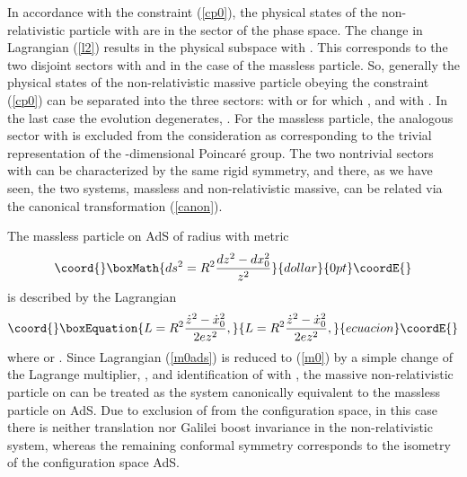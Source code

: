 \documentclass[a4paper,12pt]{article}
\begin{document}
In accordance with the constraint
(\ref{cp0}),
the physical states
of the non-relativistic particle
with \coordHE{}  are in the \coordHE{} sector
of the phase space.
The change
\coordHE{} in Lagrangian (\ref{l2})
results in the physical subspace with \coordHE{}.
This corresponds to the two disjoint sectors with
\coordHE{}
and \coordHE{}
in the case of the massless particle.
So, generally the physical states
of the non-relativistic massive particle
obeying the constraint (\ref{cp0})
can be separated into the three sectors:
with \coordHE{} or \coordHE{} for which \coordHE{},
and with \coordHE{}.
In the last case the
evolution degenerates,
\coordHE{}.
For the massless particle,
the analogous sector
with \coordHE{}
is excluded from the consideration
as corresponding to the trivial representation
of the \coordHE{}-dimensional Poincar\'e group.
The two nontrivial sectors
with \coordHE{}
can be  characterized
by the same rigid \coordHE{} symmetry, and
there, as we have seen,
the two systems, massless
and non-relativistic massive,
can be related via the canonical transformation
(\ref{canon}).




The massless particle on AdS\coordHE{}
of radius \coordHE{}
with metric \cite{Ahar}
$$\coord{}\boxMath{
ds^2=R^2\frac{d z^2-dx_0^2}{z^2}
}{dollar}{0pt}\coordE{}$$
is described by the Lagrangian
\begin{equation}\coord{}\boxEquation{
L=R^2\frac{\dot z^2-\dot x_0^2}{2ez^2},
\label{m0ads}
}{
L=R^2\frac{\dot z^2-\dot x_0^2}{2ez^2},
}{ecuacion}\coordE{}\end{equation}
where \coordHE{} or \coordHE{}.
Since Lagrangian (\ref{m0ads}) is reduced to
(\ref{m0}) by a simple change of the
Lagrange multiplier,
\coordHE{},
and identification of \coordHE{} with \coordHE{},
the massive non-relativistic particle
on \coordHE{} can be treated  as
the system
canonically equivalent to
the massless particle on AdS\coordHE{}.
Due to exclusion of
\coordHE{} from the configuration space,
in this case there is neither translation nor
Galilei boost invariance in the non-relativistic
system,
whereas the remaining conformal \coordHE{}
symmetry corresponds to the isometry of
the configuration space
AdS\coordHE{}.
\end{document}
